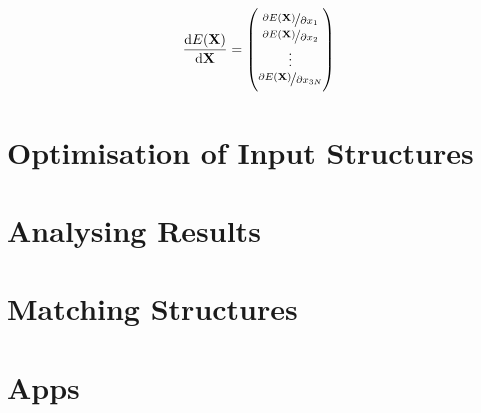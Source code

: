 \begin{align}
    \frac{\dif E(\mathbf{X})}{\dif \mathbf{X}}=
    \begin{pmatrix}
        \nicefrac{\partial E(\mathbf{X})}{\partial x_1}\\
        \nicefrac{\partial E(\mathbf{X})}{\partial x_2}\\
        \vdots\\
        \nicefrac{\partial E(\mathbf{X})}{\partial x_{3N}}
    \end{pmatrix}
\end{align}

\section{Optimisation of Input Structures}
\label{sec:optimisationofinputstructures}

\section{Analysing Results}
\label{sec:analysingresults}

\section{Matching Structures}
\label{sec:matchingstructures}

\section{Apps}
\label{sec:apps}
